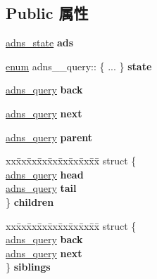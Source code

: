 \subsection*{Public 属性}
\begin{DoxyCompactItemize}
\item 
\mbox{\label{structadns____query_a84191070a022179974e3549272b9d05b}} 
\hyperlink{structadns____state}{adns\+\_\+state} {\bfseries ads}
\item 
\mbox{\label{structadns____query_aa92b821f3bd09ac09812b7808f58637f}} 
\hyperlink{interfaceenum}{enum} adns\+\_\+\+\_\+query\+:: \{ ... \}  {\bfseries state}
\item 
\mbox{\label{structadns____query_af640b6520659c0562b37221f229e2e21}} 
\hyperlink{structadns____query}{adns\+\_\+query} {\bfseries back}
\item 
\mbox{\label{structadns____query_a403fadb3db86c8c03e6807bb652cdf68}} 
\hyperlink{structadns____query}{adns\+\_\+query} {\bfseries next}
\item 
\mbox{\label{structadns____query_a15f039e252934402e80353bc84c62d4e}} 
\hyperlink{structadns____query}{adns\+\_\+query} {\bfseries parent}
\item 
\mbox{\label{structadns____query_adb4c3b303b88ff06a78458c777e19cc3}} 
\begin{tabbing}
xx\=xx\=xx\=xx\=xx\=xx\=xx\=xx\=xx\=\kill
struct \{\\
\>\hyperlink{structadns____query}{adns\_query} {\bfseries head}\\
\>\hyperlink{structadns____query}{adns\_query} {\bfseries tail}\\
\} {\bfseries children}\\

\end{tabbing}\item 
\mbox{\label{structadns____query_abdbc2055352090a0a63f9119657f83c1}} 
\begin{tabbing}
xx\=xx\=xx\=xx\=xx\=xx\=xx\=xx\=xx\=\kill
struct \{\\
\>\hyperlink{structadns____query}{adns\_query} {\bfseries back}\\
\>\hyperlink{structadns____query}{adns\_query} {\bfseries next}\\
\} {\bfseries siblings}\\


\end{tabbing}
\end{DoxyCompactItemize}
